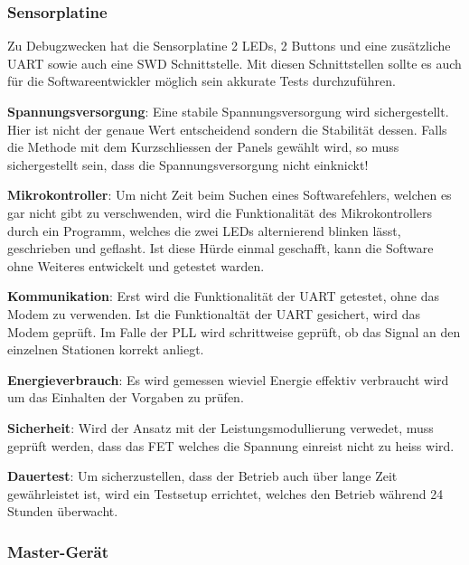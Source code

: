 \subsubsection{Sensorplatine}

Zu Debugzwecken hat die Sensorplatine 2 LEDs, 2 Buttons und eine zus\"atzliche
UART  sowie  auch eine  SWD  Schnittstelle. Mit  diesen Schnittstellen  sollte
es   auch  f\"ur   die  Softwareentwickler   m\"oglich  sein   akkurate  Tests
durchzuf\"uhren.

\textbf{Spannungsversorgung}: Eine     stabile    Spannungsversorgung     wird
sichergestellt. Hier  ist  nicht  der  genaue Wert  entscheidend  sondern  die
Stabilit\"at  dessen. Falls  die Methode  mit  dem  Kurzschliessen der  Panels
gew\"ahlt  wird, so  muss  sichergestellt sein,  dass die  Spannungsversorgung
nicht einknickt!

\textbf{Mikrokontroller}: Um  nicht Zeit  beim  Suchen eines  Softwarefehlers,
welchen  es gar  nicht gibt  zu  verschwenden, wird  die Funktionalit\"at  des
Mikrokontrollers  durch  ein  Programm,  welches die  zwei  LEDs  alternierend
blinken l\"asst, geschrieben und geflasht. Ist diese H\"urde einmal geschafft,
kann die Software ohne Weiteres entwickelt und getestet warden.

\textbf{Kommunikation}: Erst wird die Funktionalit\"at der UART getestet, ohne
das Modem zu  verwenden. Ist die Funktionalt\"at der UART  gesichert, wird das
Modem gepr\"uft. Im Falle  der PLL wird schrittweise gepr\"uft,  ob das Signal
an den einzelnen Stationen korrekt anliegt.

\textbf{Energieverbrauch}: Es   wird   gemessen   wieviel   Energie   effektiv
verbraucht wird um das Einhalten der Vorgaben zu pr\"ufen.

\textbf{Sicherheit}: Wird der  Ansatz mit der  Leistungsmodullierung verwedet,
muss gepr\"uft  werden, dass das  FET welches  die Spannung einreist  nicht zu
heiss wird.

\textbf{Dauertest}: Um  sicherzustellen, dass  der Betrieb  auch \"uber  lange
Zeit gew\"ahrleistet  ist, wird ein  Testsetup errichtet, welches  den Betrieb
w\"ahrend 24 Stunden \"uberwacht.


\subsubsection{Master-Ger\"at}

